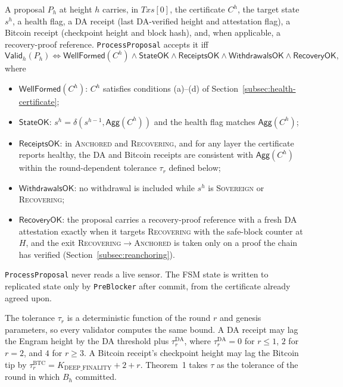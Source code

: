 A proposal $P_h$ at height $h$ carries, in $\mathit{Txs}[0]$, the certificate
$C^{h}$, the target state $s^{h}$, a health flag, a DA receipt (last
DA-verified height and attestation flag), a Bitcoin receipt (checkpoint
height and block hash), and, when applicable, a recovery-proof reference.
\texttt{ProcessProposal} accepts it iff
\begin{equation}
\mathsf{Valid}_h(P_h) \iff \mathsf{WellFormed}(C^{h}) \wedge \mathsf{StateOK}
\wedge \mathsf{ReceiptsOK} \wedge \mathsf{WithdrawalsOK} \wedge
\mathsf{RecoveryOK},
\label{eq:valid}
\end{equation}
where
\begin{itemize}
  \item $\mathsf{WellFormed}(C^{h})$: $C^{h}$ satisfies conditions (a)--(d) of
  Section~\ref{subsec:health-certificate};
  \item $\mathsf{StateOK}$: $s^{h} = \delta(s^{h-1}, \mathsf{Agg}(C^{h}))$ and
  the health flag matches $\mathsf{Agg}(C^{h})$;
  \item $\mathsf{ReceiptsOK}$: in \textsc{Anchored} and \textsc{Recovering},
  and for any layer the certificate reports healthy, the DA and Bitcoin
  receipts are consistent with $\mathsf{Agg}(C^{h})$ within the round-dependent
  tolerance $\tau_r$ defined below;
  \item $\mathsf{WithdrawalsOK}$: no withdrawal is included while $s^{h}$ is
  \textsc{Sovereign} or \textsc{Recovering};
  \item $\mathsf{RecoveryOK}$: the proposal carries a recovery-proof reference
  with a fresh DA attestation exactly when it targets \textsc{Recovering} with
  the safe-block counter at $H$, and the exit
  \textsc{Recovering}$\to$\textsc{Anchored} is taken only on a proof the chain
  has verified (Section~\ref{subsec:reanchoring}).
\end{itemize}
\texttt{ProcessProposal} never reads a live sensor. The FSM state is written
to replicated state only by \texttt{PreBlocker} after commit, from the
certificate already agreed upon.

The tolerance $\tau_r$ is a deterministic function of the round $r$ and
genesis parameters, so every validator computes the same bound. A DA receipt
may lag the Engram height by the DA threshold plus $\tau^{\text{DA}}_r$,
where $\tau^{\text{DA}}_r = 0$ for $r \le 1$, $2$ for $r = 2$, and $4$ for
$r \ge 3$. A Bitcoin receipt's checkpoint height may lag the Bitcoin tip by
$\tau^{\text{BTC}}_r = K_{\text{DEEP\_FINALITY}} + 2 + r$. Theorem~1 takes
$\tau$ as the tolerance of the round in which $B_h$ committed.


